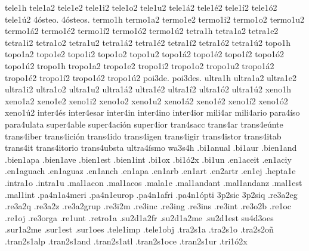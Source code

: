 {tele1h
tele1a2 tele1e2 tele1i2 tele1o2 tele1u2
tele1á2 tele1é2 tele1í2 tele1ó2 tele1ú2
4ósteo.
4ósteos.
termo1h
termo1a2 termo1e2 termo1i2 termo1o2 termo1u2
termo1á2 termo1é2 termo1í2 termo1ó2 termo1ú2
tetra1h
tetra1a2 tetra1e2 tetra1i2 tetra1o2 tetra1u2
tetra1á2 tetra1é2 tetra1í2 tetra1ó2 tetra1ú2
topo1h
topo1a2 topo1e2 topo1i2 topo1o2 topo1u2
topo1á2 topo1é2 topo1í2 topo1ó2 topo1ú2
tropo1h
tropo1a2 tropo1e2 tropo1i2 tropo1o2 tropo1u2
tropo1á2 tropo1é2 tropo1í2 tropo1ó2 tropo1ú2
poi3de.
poi3des.
ultra1h
ultra1a2 ultra1e2 ultra1i2 ultra1o2 ultra1u2
ultra1á2 ultra1é2 ultra1í2 ultra1ó2 ultra1ú2
xeno1h
xeno1a2 xeno1e2 xeno1i2 xeno1o2 xeno1u2
xeno1á2 xeno1é2 xeno1í2 xeno1ó2 xeno1ú2
inter4és
inter4esar
inter4in
inter4ino
inter4ior
mili4ar
mili4ario
para4íso
para4ulata
super4able
super4ación
super4ior
tran4sacc
trans4ar
trans4eúnte
trans4iber
trans4ición
trans4ido
trans4igen
trans4igir
trans4istor
trans4itab
trans4it
trans4itorio
trans4ubsta
ultra4ísmo
wa3s4h
.bi1anual
.bi1aur
.bien1and
.bien1apa
.bien1ave
.bien1est
.bien1int
.bi1ox
.bi1ó2x
.bi1un
.en1aceit
.en1aciy
.en1aguach
.en1aguaz
.en1anch
.en1apa
.en1arb
.en1art
.en2artr
.en1ej
.hepta1e
.intra1o
.intra1u
.mal1acon
.mal1acos
.mala1e
.mal1andant
.mal1andanz
.mal1est
.mal1int
.pa4n1a4meri
.pa4n1europ
.pa4n1afri
.pa4n1ópti
3p2sic
3p2siq
.re3a2eg
.re3a2q
.re3a2z
.re3a2grup
.re3i2m
.re3inc
.re3ing
.re3ins
.re3int
.re3o2b
.re1oc
.re1oj
.re3orga
.re1unt
.retro1a
.su2d1a2fr
.su2d1a2me
.su2d1est
su4d3oes
.sur1a2me
.sur1est
.sur1oes
.tele1imp
.tele1obj
.tra2s1a
.tra2s1o
.tra2s2oñ
.tran2s1alp
.tran2s1and
.tran2s1atl
.tran2s1oce
.tran2s1ur
.tri1ó2x
}
